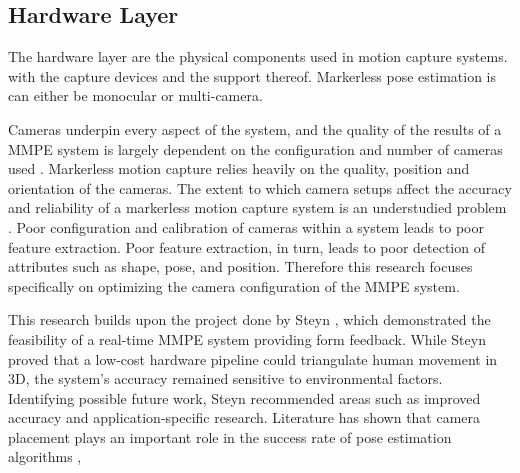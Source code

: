 \subsection{Hardware Layer}

The hardware layer are the physical components used in motion capture systems. with the capture devices and the support thereof. Markerless pose estimation is can either be monocular
or multi-camera. 

Cameras underpin every aspect of the system, and the quality of the results of a MMPE system is largely dependent on the configuration and number of cameras used \cite{rahimian2016optimal}. 
Markerless motion capture relies heavily on the quality, position and orientation of the cameras. The extent to which camera setups affect the accuracy and reliability of a markerless motion capture system is an understudied problem \cite{kwak2025assessing}.
Poor configuration and calibration of cameras within a system leads to poor feature extraction. Poor feature extraction, in turn, leads to poor detection of attributes such as shape, pose, and position. Therefore this research focuses specifically on optimizing the camera configuration of the MMPE system.

This research builds upon the project done by Steyn \cite{steyn2024markerless}, which demonstrated the feasibility of a real-time MMPE system providing form feedback. While Steyn \cite{steyn2024markerless} proved that a low-cost hardware pipeline could triangulate human movement in 3D, the system’s accuracy remained sensitive to environmental factors. Identifying possible future work, Steyn \cite{steyn2024markerless} recommended areas such as improved accuracy and application-specific research. 
Literature has shown that camera placement plays an important role in the success rate of pose estimation algorithms \cite{rahimian2016optimal, jorgensen2018simulation}, %

